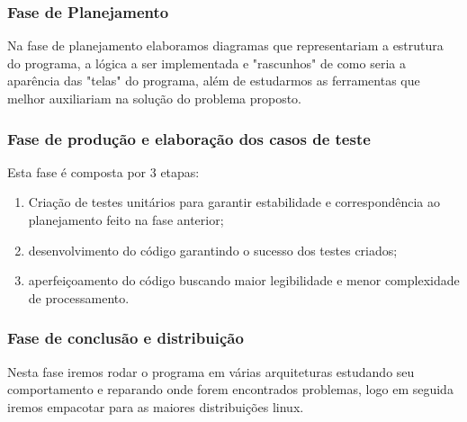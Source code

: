 \documentclass[a4paper,12pt]{article}
\begin{document}
			\subsubsection{Fase de Planejamento}
			Na fase de planejamento elaboramos diagramas que representariam a estrutura do programa, a lógica a ser implementada e "rascunhos" de como seria a aparência das "telas" do programa, além de estudarmos as ferramentas que melhor auxiliariam na solução do problema proposto.
			\subsubsection{Fase de produção e elaboração dos casos de teste}
			Esta fase é composta por 3 etapas:
			\begin{enumerate}
				\item Criação de testes unitários para garantir estabilidade e correspondência ao planejamento feito na fase anterior;
				\item desenvolvimento do código garantindo o sucesso dos testes criados;
				\item aperfeiçoamento do código buscando maior legibilidade e menor complexidade de processamento. 
			\end{enumerate}
			\subsubsection{Fase de conclusão e distribuição}
			Nesta fase iremos rodar o programa em várias arquiteturas estudando seu comportamento e reparando onde forem encontrados problemas, logo em seguida iremos empacotar para as maiores distribuições linux.
\end{document}
